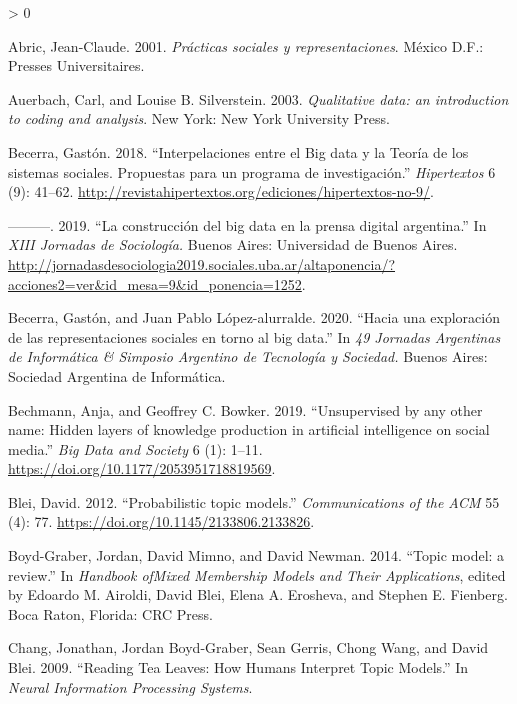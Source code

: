 \documentclass[
]{book}
\newlength{\cslhangindent}
\newenvironment{CSLReferences}[2] %
 {%
  \setlength{\parindent}{0pt}
  \ifodd #1 \everypar{\setlength{\hangindent}{\cslhangindent}}\ignorespaces\fi
  \ifnum #2 > 0
  \setlength{\parskip}{#2\baselineskip}
  \fi
 }%
 {}
\begin{document}
\hypertarget{refs}{}
\begin{CSLReferences}{1}{0}
\leavevmode\hypertarget{ref-Abric2001}{}%
Abric, Jean-Claude. 2001. \emph{{Pr{á}cticas sociales y representaciones}}. M{é}xico D.F.: Presses Universitaires.

\leavevmode\hypertarget{ref-Auerbach2003}{}%
Auerbach, Carl, and Louise B. Silverstein. 2003. \emph{{Qualitative data: an introduction to coding and analysis}}. New York: New York University Press.

\leavevmode\hypertarget{ref-Becerra2018}{}%
Becerra, Gastón. 2018. {``{Interpelaciones entre el Big data y la Teor{í}a de los sistemas sociales. Propuestas para un programa de investigaci{ó}n.}''} \emph{Hipertextos} 6 (9): 41--62. \url{http://revistahipertextos.org/ediciones/hipertextos-no-9/}.

\leavevmode\hypertarget{ref-Becerra2019}{}%
---------. 2019. {``{La construcci{ó}n del big data en la prensa digital argentina}.''} In \emph{XIII Jornadas de Sociolog{í}a.} Buenos Aires: Universidad de Buenos Aires. \url{http://jornadasdesociologia2019.sociales.uba.ar/altaponencia/?acciones2=ver\&id_mesa=9\&id_ponencia=1252}.

\leavevmode\hypertarget{ref-Becerra2020}{}%
Becerra, Gastón, and Juan Pablo López-alurralde. 2020. {``{Hacia una exploraci{ó}n de las representaciones sociales en torno al big data}.''} In \emph{49 Jornadas Argentinas de Inform{á}tica {\&} Simposio Argentino de Tecnolog{í}a y Sociedad.} Buenos Aires: Sociedad Argentina de Inform{á}tica.

\leavevmode\hypertarget{ref-Bechmann2019}{}%
Bechmann, Anja, and Geoffrey C. Bowker. 2019. {``{Unsupervised by any other name: Hidden layers of knowledge production in artificial intelligence on social media}.''} \emph{Big Data and Society} 6 (1): 1--11. \url{https://doi.org/10.1177/2053951718819569}.

\leavevmode\hypertarget{ref-Blei2012}{}%
Blei, David. 2012. {``{Probabilistic topic models}.''} \emph{Communications of the ACM} 55 (4): 77. \url{https://doi.org/10.1145/2133806.2133826}.

\leavevmode\hypertarget{ref-Boyd-Graber2014}{}%
Boyd-Graber, Jordan, David Mimno, and David Newman. 2014. {``{Topic model: a review}.''} In \emph{Handbook ofMixed Membership Models and Their Applications}, edited by Edoardo M. Airoldi, David Blei, Elena A. Erosheva, and Stephen E. Fienberg. Boca Raton, Florida: CRC Press.

\leavevmode\hypertarget{ref-Chang2009}{}%
Chang, Jonathan, Jordan Boyd-Graber, Sean Gerris, Chong Wang, and David Blei. 2009. {``{Reading Tea Leaves: How Humans Interpret Topic Models}.''} In \emph{Neural Information Processing Systems}.


\end{CSLReferences}
\end{document}
